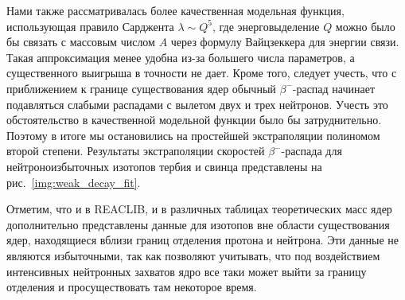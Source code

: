   

  Нами также рассматривалась более качественная модельная функция, использующая правило Сарджента $\lambda \sim Q^5$, где энерговыделение $Q$ можно было бы связать с массовым числом $A$ через формулу Вайцзеккера для энергии связи. Такая аппроксимация менее удобна из-за большего числа параметров, а существенного выигрыша в точности не дает. Кроме того, следует учесть, что с приближением к границе существования ядер обычный $\beta^-$-распад начинает подавляться слабыми распадами с вылетом двух и трех нейтронов. Учесть это обстоятельство в качественной модельной функции было бы затруднительно. Поэтому в итоге мы остановились на простейшей экстраполяции полиномом второй степени. Результаты экстраполяции скоростей $\beta^-$-распада для нейтроноизбыточных изотопов тербия и свинца представлены на рис.~\ref{img:weak_decay_fit}.

  Отметим, что и в REACLIB, и в различных таблицах теоретических масс ядер дополнительно представлены данные для изотопов вне области существования ядер, находящиеся вблизи границ отделения протона и нейтрона. Эти данные не являются избыточными, так как позволяют учитывать, что под воздействием интенсивных нейтронных захватов ядро все таки может выйти за границу отделения и просуществовать там некоторое время.   
